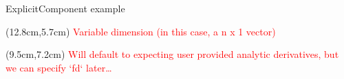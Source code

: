 \documentclass[aspectratio=169, usenames,dvipsnames, 14pt]{beamer}
\begin{document}
\begin{frame}{ExplicitComponent example}
{        \begin{textblock*}{3cm}(12.8cm,5.7cm)
            \footnotesize \textcolor{red}{Variable dimension (in this case, a n x 1 vector)}
        \end{textblock*}    
    
        \begin{textblock*}{3.6cm}(9.5cm,7.2cm)
            \footnotesize \textcolor{red}{Will default to expecting user provided analytic derivatives, but we can specify `fd` later…}
        \end{textblock*}   
  }
\end{frame}     %
\end{document}
